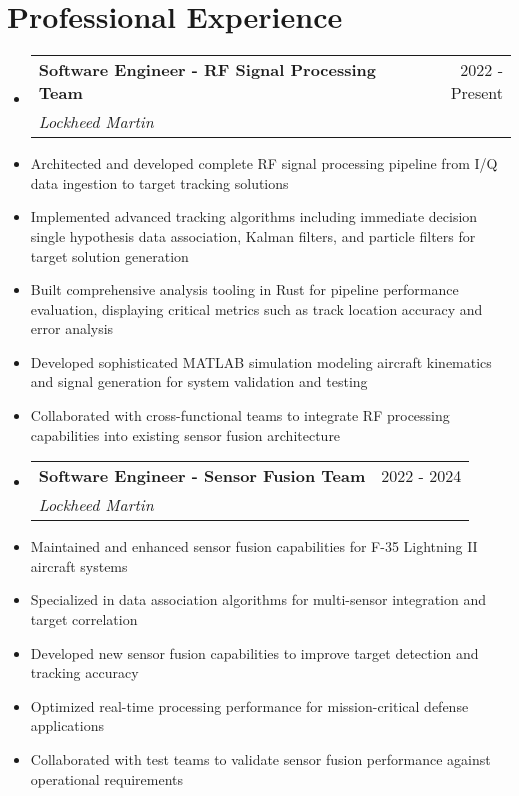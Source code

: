 \documentclass[11pt,a4paper]{article}
\makeatletter
\newcommand{\resumeItem}[1]{
  \item\small{#1}
}
\newcommand{\resumeSubheading}[4]{
  \vspace{-2pt}\item
    \begin{tabular*}{0.97\textwidth}[t]{l@{\extracolsep{\fill}}r}
      \textbf{#1} & #2 \\
      \textit{\small#3} & \textit{\small #4} \\
    \end{tabular*}\vspace{-7pt}
}
\makeatother
\begin{document}
\section{Professional Experience}
\begin{itemize}[leftmargin=0.15in, label={}]
    \resumeSubheading
        {Software Engineer - RF Signal Processing Team}{2022 - Present}
        {Lockheed Martin}{}
        \resumeItemListStart
            \resumeItem{Architected and developed complete RF signal processing pipeline from I/Q data ingestion to target tracking solutions}
            \resumeItem{Implemented advanced tracking algorithms including immediate decision single hypothesis data association, Kalman filters, and particle filters for target solution generation}
            \resumeItem{Built comprehensive analysis tooling in Rust for pipeline performance evaluation, displaying critical metrics such as track location accuracy and error analysis}
            \resumeItem{Developed sophisticated MATLAB simulation modeling aircraft kinematics and signal generation for system validation and testing}
            \resumeItem{Collaborated with cross-functional teams to integrate RF processing capabilities into existing sensor fusion architecture}
        \resumeItemListEnd

    \resumeSubheading
        {Software Engineer - Sensor Fusion Team}{2022 - 2024}
        {Lockheed Martin}{}
        \resumeItemListStart
            \resumeItem{Maintained and enhanced sensor fusion capabilities for F-35 Lightning II aircraft systems}
            \resumeItem{Specialized in data association algorithms for multi-sensor integration and target correlation}
            \resumeItem{Developed new sensor fusion capabilities to improve target detection and tracking accuracy}
            \resumeItem{Optimized real-time processing performance for mission-critical defense applications}
            \resumeItem{Collaborated with test teams to validate sensor fusion performance against operational requirements}
        \resumeItemListEnd


\end{itemize}
\end{document}
